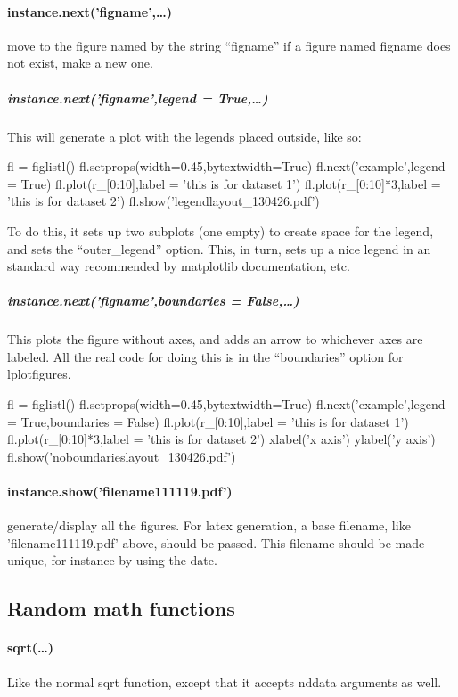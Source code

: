     \paragraph{instance.next('figname',\ldots)} move to the figure named by the string ``figname''
    if a figure named figname does not exist, make a new one.

    \subparagraph{instance.next('figname',legend = True,\ldots)}
    This will generate a plot with the legends placed outside, like so:

\begin{python}[on]
fl = figlistl()
fl.setprops(width=0.45,bytextwidth=True)
fl.next('example',legend = True)
fl.plot(r_[0:10],label = 'this is for dataset 1')
fl.plot(r_[0:10]*3,label = 'this is for dataset 2')
fl.show('legendlayout_130426.pdf')
\end{python}
    
    To do this, it sets up two subplots (one empty) to create space for the legend, and sets the ``outer\_legend'' option.
    This, in turn, sets up a nice legend in an standard way recommended by matplotlib documentation, etc.
    \subparagraph{instance.next('figname',boundaries = False,\ldots)}
    This plots the figure without axes, and adds an arrow to whichever axes are labeled.
    All the real code for doing this is in the ``boundaries'' option for lplotfigures.

\begin{python}[on]
fl = figlistl()
fl.setprops(width=0.45,bytextwidth=True)
fl.next('example',legend = True,boundaries = False)
fl.plot(r_[0:10],label = 'this is for dataset 1')
fl.plot(r_[0:10]*3,label = 'this is for dataset 2')
xlabel('x axis')
ylabel('y axis')
fl.show('noboundarieslayout_130426.pdf')
\end{python}
    \paragraph{instance.show('filename111119.pdf')} generate/display
        all the figures.
        For latex generation, a base filename, like 'filename111119.pdf' above, should be passed.
        This filename should be made unique, for instance by using the date.
\subsection{Random math functions}
\paragraph{sqrt(\ldots)}
Like the normal sqrt function, except that it accepts nddata arguments as well.
